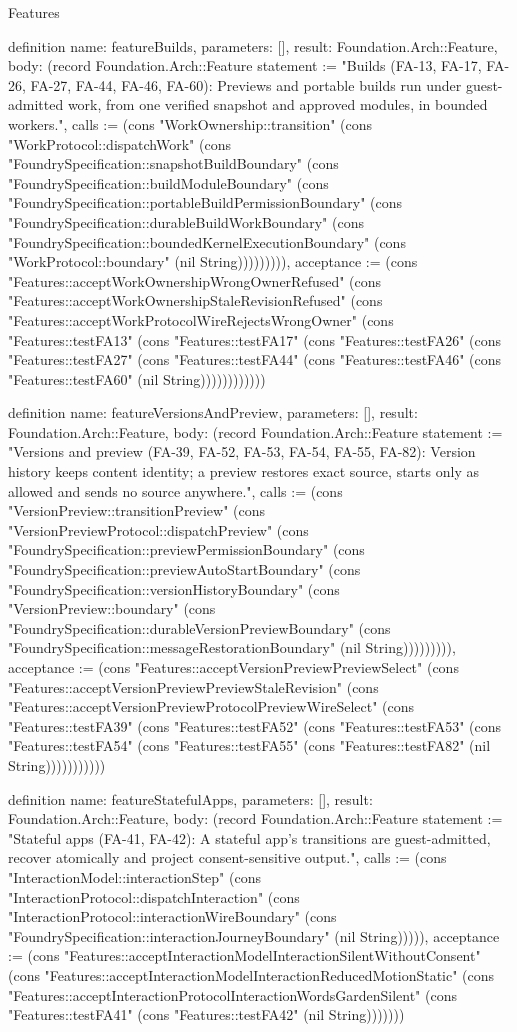 \begin{lexlean}{Features}
\begin{semanticmodule}
definition{
  name: featureBuilds,
  parameters: [],
  result: Foundation.Arch::Feature,
  body: (record Foundation.Arch::Feature {statement := "Builds (FA-13, FA-17, FA-26, FA-27, FA-44, FA-46, FA-60): Previews and portable builds run under guest-admitted work, from one verified snapshot and approved modules, in bounded workers.", calls := (cons "WorkOwnership::transition" (cons "WorkProtocol::dispatchWork" (cons "FoundrySpecification::snapshotBuildBoundary" (cons "FoundrySpecification::buildModuleBoundary" (cons "FoundrySpecification::portableBuildPermissionBoundary" (cons "FoundrySpecification::durableBuildWorkBoundary" (cons "FoundrySpecification::boundedKernelExecutionBoundary" (cons "WorkProtocol::boundary" (nil String))))))))), acceptance := (cons "Features::acceptWorkOwnershipWrongOwnerRefused" (cons "Features::acceptWorkOwnershipStaleRevisionRefused" (cons "Features::acceptWorkProtocolWireRejectsWrongOwner" (cons "Features::testFA13" (cons "Features::testFA17" (cons "Features::testFA26" (cons "Features::testFA27" (cons "Features::testFA44" (cons "Features::testFA46" (cons "Features::testFA60" (nil String)))))))))))})
}

definition{
  name: featureVersionsAndPreview,
  parameters: [],
  result: Foundation.Arch::Feature,
  body: (record Foundation.Arch::Feature {statement := "Versions and preview (FA-39, FA-52, FA-53, FA-54, FA-55, FA-82): Version history keeps content identity; a preview restores exact source, starts only as allowed and sends no source anywhere.", calls := (cons "VersionPreview::transitionPreview" (cons "VersionPreviewProtocol::dispatchPreview" (cons "FoundrySpecification::previewPermissionBoundary" (cons "FoundrySpecification::previewAutoStartBoundary" (cons "FoundrySpecification::versionHistoryBoundary" (cons "VersionPreview::boundary" (cons "FoundrySpecification::durableVersionPreviewBoundary" (cons "FoundrySpecification::messageRestorationBoundary" (nil String))))))))), acceptance := (cons "Features::acceptVersionPreviewPreviewSelect" (cons "Features::acceptVersionPreviewPreviewStaleRevision" (cons "Features::acceptVersionPreviewProtocolPreviewWireSelect" (cons "Features::testFA39" (cons "Features::testFA52" (cons "Features::testFA53" (cons "Features::testFA54" (cons "Features::testFA55" (cons "Features::testFA82" (nil String))))))))))})
}

definition{
  name: featureStatefulApps,
  parameters: [],
  result: Foundation.Arch::Feature,
  body: (record Foundation.Arch::Feature {statement := "Stateful apps (FA-41, FA-42): A stateful app's transitions are guest-admitted, recover atomically and project consent-sensitive output.", calls := (cons "InteractionModel::interactionStep" (cons "InteractionProtocol::dispatchInteraction" (cons "InteractionProtocol::interactionWireBoundary" (cons "FoundrySpecification::interactionJourneyBoundary" (nil String))))), acceptance := (cons "Features::acceptInteractionModelInteractionSilentWithoutConsent" (cons "Features::acceptInteractionModelInteractionReducedMotionStatic" (cons "Features::acceptInteractionProtocolInteractionWordsGardenSilent" (cons "Features::testFA41" (cons "Features::testFA42" (nil String))))))})
}


\end{semanticmodule}
\end{lexlean}
